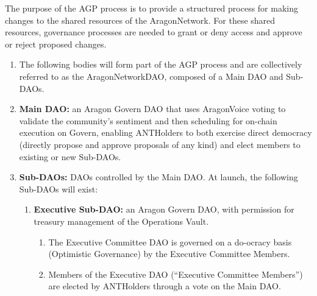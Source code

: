 
\label{chap:AGPProcess}

The purpose of the \acf{AGP} process is to provide a structured process for making changes to the shared resources of the \gls{AragonNetwork}.
For these shared resources, governance processes are needed to grant or deny access and approve or reject proposed changes.

\begin{enumerate}
	
	\begin{enumerate}
		
		\item The following bodies will form part of the \ac{AGP} process and are collectively referred to as the \gls{AragonNetworkDAO}, composed of a Main \ac{DAO} and Sub-\acp{DAO}.
		\item \textbf{Main \ac{DAO}:} an Aragon Govern \ac{DAO} that uses \gls{AragonVoice} voting to validate the community’s sentiment and then scheduling for on-chain execution on Govern, enabling \glspl{ANTHolder} to both exercise direct democracy (directly propose and approve proposals of any kind) and elect members to existing or new Sub-\acp{DAO}.
		\item \textbf{Sub-\acp{DAO}:} \acp{DAO} controlled by the Main \ac{DAO}.
		At launch, the following Sub-\acp{DAO} will exist:
		\begin{enumerate}
			
			\item \textbf{Executive Sub-\ac{DAO}:} an Aragon Govern \ac{DAO}, with permission for treasury management of the Operations Vault.
			\begin{enumerate}
				\item The Executive Committee \ac{DAO} is governed on a do-ocracy basis (Optimistic Governance) by the Executive Committee Members.
				\item Members of the Executive \ac{DAO} (``Executive Committee Members'') are elected by \glspl{ANTHolder} through a vote on the Main \ac{DAO}.
			\end{enumerate}
		

\end{enumerate}
\end{enumerate}
\end{enumerate}
